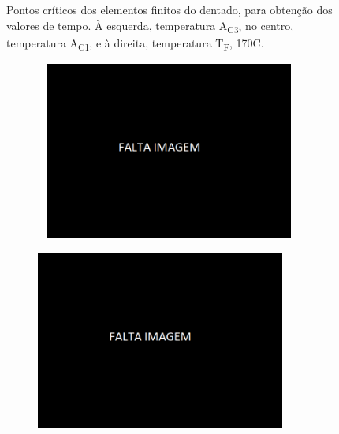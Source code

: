 \begin{figure}[htb]
\begin{subfigure}{.33\textwidth}
        \caption{}
        \label{fig:Tf_Dent}
    \end{subfigure}
    \caption[Pontos críticos dos elementos finitos do dentado]%
    {Pontos críticos dos elementos finitos do dentado, para obtenção dos valores de tempo. À esquerda, temperatura A\textsubscript{C3}, no centro, temperatura A\textsubscript{C1}, e à direita, temperatura T\textsubscript{F}, 170\textdegree C.}
    \label{fig:Dentado}
\end{figure}
\begin{figure}[htb]
    \centering
    \begin{subfigure}{.33\textwidth}\
        \centering
        \includegraphics[width = 0.9\textwidth]{Figures/Cap4/Falta_Imagem.png}
        \caption[]%
        {}
        \label{fig:A3_Dint}
    \end{subfigure}%
    \begin{subfigure}{.33\textwidth}
        \centering
        \includegraphics[width = 0.9\textwidth]{Figures/Cap4/Falta_Imagem.png}

\end{subfigure}
\end{figure}
